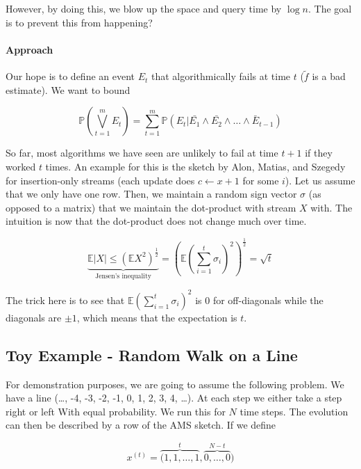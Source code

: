 \documentclass[11pt]{article}
\begin{document}
However, by doing this, we blow up the space and query time by $\log n$. The goal is to prevent this from happening? 

\paragraph{Approach} Our hope is to define an event $E_t$ that algorithmically fails at time $t$ ($\tilde{f}$ is a bad estimate). We want to bound 

\begin{equation*}
\mathbb{P}(\bigvee\limits_{t=1}^m E_t) = \sum\limits_{t=1}^m \mathbb{P}(E_t|\bar{E_1} \wedge \bar{E_2} \wedge \ldots \wedge \bar{E}_{t-1})
\end{equation*}

So far, most algorithms we have seen are unlikely to fail at time $t+1$ if they worked $t$ times. An example for this is the sketch by Alon, Matias, and Szegedy~\cite{AlonMS99} for insertion-only streams (each update does $c \leftarrow x + 1$ for some $i$). Let us assume that we only have one row. Then, we maintain a random sign vector $\sigma$ (as opposed to a matrix) that we maintain the dot-product with stream $X$ with. The intuition is now that the dot-product does not change much over time.

\begin{equation*}
\underbrace{\mathbb{E}|X| \leq (\mathbb{E}X^2)^{\frac{1}{2}}}_{\text{Jensen's inequality}} = (\mathbb{E}(\sum\limits_{i=1}^t \sigma_i)^2)^{\frac{1}{2}} = \sqrt{t}
\end{equation*}

The trick here is to see that $\mathbb{E}(\sum\limits_{i=1}^t \sigma_i)^2$ is 0 for off-diagonals while the diagonals are $\pm 1$, which means that the expectation is $t$.

\subsection*{Toy Example - Random Walk on a Line}

For demonstration purposes, we are going to assume the following problem. We have a line (\ldots, -4, -3, -2, -1, 0, 1, 2, 3, 4, \ldots). At each step we either take a step right or left With equal probability. We run this for $N$ time steps. The evolution can then be described by a row of the AMS sketch. If we define 

\begin{equation*}
x^{(t)} = \overbrace{(1,1, \ldots, 1}^{t}, \overbrace{0, \ldots, 0}^{N-t})
\end{equation*}
\end{document}
